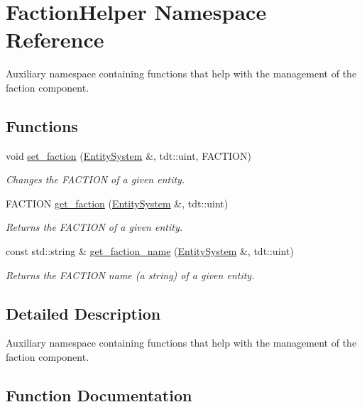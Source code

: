 \hypertarget{namespace_faction_helper}{}\section{Faction\+Helper Namespace Reference}
\label{namespace_faction_helper}


Auxiliary namespace containing functions that help with the management of the faction component.  


\subsection*{Functions}
\begin{DoxyCompactItemize}
\item 
void \hyperlink{namespace_faction_helper_a74cda902ec861d31f07a424cb819c3b0}{set\+\_\+faction} (\hyperlink{class_entity_system}{Entity\+System} \&, tdt\+::uint, F\+A\+C\+T\+I\+ON)
\begin{DoxyCompactList}\small\item\em Changes the F\+A\+C\+T\+I\+ON of a given entity. \end{DoxyCompactList}\item 
F\+A\+C\+T\+I\+ON \hyperlink{namespace_faction_helper_ae38c2a2bc21d3057bcc4739f09003598}{get\+\_\+faction} (\hyperlink{class_entity_system}{Entity\+System} \&, tdt\+::uint)
\begin{DoxyCompactList}\small\item\em Returns the F\+A\+C\+T\+I\+ON of a given entity. \end{DoxyCompactList}\item 
const std\+::string \& \hyperlink{namespace_faction_helper_afccc796fcbd5e90b9ce4249cbd45800e}{get\+\_\+faction\+\_\+name} (\hyperlink{class_entity_system}{Entity\+System} \&, tdt\+::uint)
\begin{DoxyCompactList}\small\item\em Returns the F\+A\+C\+T\+I\+ON name (a string) of a given entity. \end{DoxyCompactList}\end{DoxyCompactItemize}


\subsection{Detailed Description}
Auxiliary namespace containing functions that help with the management of the faction component. 

\subsection{Function Documentation}
